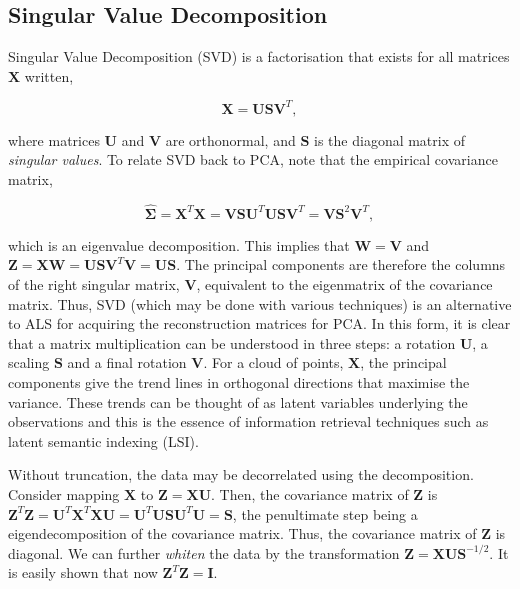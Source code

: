 \documentclass[11pt]{amsart}
\begin{document}
\subsection{Singular Value Decomposition}

Singular Value Decomposition (SVD) is a factorisation that exists for all matrices $\mathbf{X}$ written,

$$\mathbf{X} = \mathbf{U}\mathbf{S}\mathbf{V}^T,$$

where matrices $\mathbf{U}$ and $\mathbf{V}$ are orthonormal, and $\mathbf{S}$ is the diagonal matrix of \emph{singular values}. To relate SVD back to PCA, note that the empirical covariance matrix,

$$\hat{\boldsymbol\Sigma} = \mathbf{X}^T\mathbf{X} = \mathbf{V}\mathbf{S}\mathbf{U}^T\mathbf{U}\mathbf{S}\mathbf{V}^T =  \mathbf{V}\mathbf{S}^2\mathbf{V}^T,$$

which is an eigenvalue decomposition. This implies that $\mathbf{W} = \mathbf{V}$ and $\mathbf{Z} = \mathbf{X}\mathbf{W} = \mathbf{U}\mathbf{S}\mathbf{V}^T\mathbf{V} = \mathbf{U}\mathbf{S}$. The principal components are therefore the columns of the right singular matrix, $\mathbf{V}$, equivalent to the eigenmatrix of the covariance matrix. Thus, SVD (which may be done with various techniques) is an alternative to ALS for acquiring the reconstruction matrices for PCA. In this form, it is clear that a matrix multiplication can be understood in three steps: a rotation $\mathbf{U}$, a scaling $\mathbf{S}$ and a final rotation $\mathbf{V}$. For a cloud of points, $\mathbf{X}$, the principal components give the trend lines in orthogonal directions that maximise the variance. These trends can be thought of as latent variables underlying the observations and this is the essence of information retrieval techniques such as latent semantic indexing (LSI).

Without truncation, the data may be decorrelated using the decomposition. Consider mapping $\mathbf{X}$ to $\mathbf{Z} = \mathbf{X}\mathbf{U}$. Then, the covariance matrix of $\mathbf{Z}$ is $\mathbf{Z}^T\mathbf{Z} = \mathbf{U}^T\mathbf{X}^T\mathbf{X}\mathbf{U} = \mathbf{U}^T\mathbf{U}\mathbf{S}\mathbf{U}^T\mathbf{U} = \mathbf{S}$, the penultimate step being a eigendecomposition of the covariance matrix. Thus, the covariance matrix of $\mathbf{Z}$ is diagonal. We can further \emph{whiten} the data by the transformation $\mathbf{Z} = \mathbf{X}\mathbf{U}\mathbf{S}^{-1/2}$. It is easily shown that now $\mathbf{Z}^T\mathbf{Z} = \mathbf{I}$.
\end{document}

